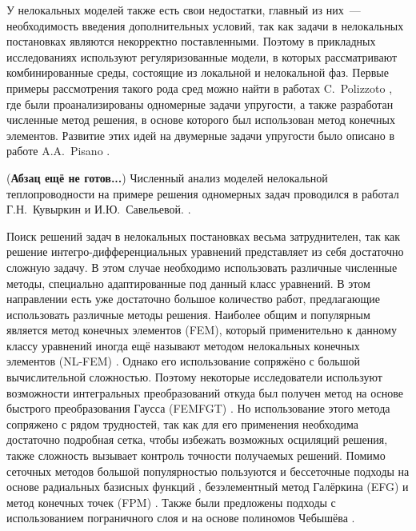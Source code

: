 У нелокальных моделей также есть свои недостатки, главный из них~--- необходимость введения дополнительных условий, так как задачи в нелокальных постановках являются некорректно поставленными. Поэтому в прикладных исследованиях используют регуляризованные модели, в которых рассматривают комбинированные среды, состоящие из локальной и нелокальной фаз. Первые примеры рассмотрения такого рода сред можно найти в работах C.~Polizzoto \cite{Polizzotto1, Polizzotto2}, где были проанализированы одномерные задачи упругости, а также разработан численные метод решения, в основе которого был использован метод конечных элементов. Развитие этих идей на двумерные задачи упругости было описано в работе A.A.~Pisano \cite{Pisano1}.

(\textbf{Абзац ещё не готов...}) Численный анализ моделей нелокальной теплопроводности на примере решения одномерных задач проводился в работал Г.Н.~Кувыркин и И.Ю.~Савельевой.
\cite{NonlocalSaintVenant}.

Поиск решений задач в нелокальных постановках весьма затруднителен, так как решение интегро-дифференциальных уравнений представляет из себя достаточно сложную задачу. В этом случае необходимо использовать различные численные методы, специально адаптированные под данный класс уравнений. В этом направлении есть уже достаточно большое количество работ, предлагающие использовать различные методы решения. Наиболее общим и популярным является метод конечных элементов (FEM), который применительно к данному классу уравнений иногда ещё называют методом нелокальных конечных элементов (NL-FEM) \cite{Polizzotto2, Pisano1}. Однако его использование сопряжёно с большой вычислительной сложностью. Поэтому некоторые исследователи используют возможности интегральных преобразований откуда был получен метод на основе быстрого преобразования Гаусса (FEMFGT) \cite{FastGaussTransform}. Но использование этого метода сопряжено с рядом трудностей, так как для его применения необходима достаточно подробная сетка, чтобы избежать возможных осциляций решения, также сложность вызывает контроль точности получаемых решений. Помимо сеточных методов большой популярностью пользуются и бессеточные подходы на основе радиальных базисных функций \cite{RadialBasis}, безэлементный метод Галёркина (EFG) и метод конечных точек (FPM) \cite{MeshFree}. Также были предложены подходы с использованием пограничного слоя \cite{BondaryLayer} и на основе полиномов Чебышёва \cite{ChebPolynom}.

